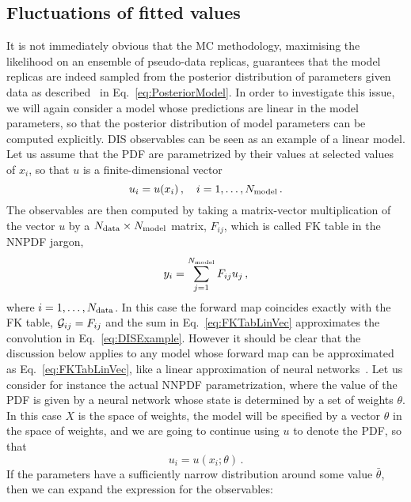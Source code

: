 \subsection{Fluctuations of fitted values}
\label{sec:fluct-fit-values}

It is not immediately obvious that the MC methodology, maximising the likelihood
on an ensemble of pseudo-data replicas, guarantees that the model replicas are
indeed sampled from the posterior distribution of parameters given data as
described \eg\ in Eq.~\ref{eq:PosteriorModel}. In order to investigate this
issue, we will again consider a model whose predictions are linear in the model
parameters, so that the posterior distribution of model parameters can be
computed explicitly. DIS observables can be seen as an example of a linear
model. Let us assume that the PDF are parametrized by their values at selected
values of $x_i$, so that $u$ is a finite-dimensional vector 
\begin{equation}
    \label{eq:Uvector}
    u_i = u(x_i)\, , \quad i = 1, \ldots, N_{\rm model}\, .    
\end{equation}
The observables are then computed by taking a matrix-vector multiplication of
the vector $u$ by a $N_{\rm data} \times N_{\rm model}$ matrix, $F_{ij}$, which is called FK
table in the NNPDF jargon, 
\begin{equation}
    \label{eq:FKTabLinVec}
    y_i = \sum_{j=1}^{N_{\rm model}} F_{ij} u_j\, ,
\end{equation}
where $i=1,\ldots,N_{\rm data}$. In this case the forward map coincides exactly with
the FK table, $\mathcal{G}_{ij} = F_{ij}$ and the sum in Eq.~\ref{eq:FKTabLinVec}
approximates the convolution in Eq.~\ref{eq:DISExample}. However it should be
clear that the discussion below applies to any model whose forward map can be
approximated as Eq.~\ref{eq:FKTabLinVec}, like a linear approximation of
neural networks~\cite{ADVANI2020428}. Let us consider for instance the actual
NNPDF parametrization, where the value of the PDF is given by a neural network
whose state is determined by a set of weights $\theta$. In this case $X$ is the
space of weights, the model will be specified by a vector $\theta$ in the space
of weights, and we are going to continue using $u$ to denote the PDF, so that 
\begin{equation}
    \label{eq:WeightsParam}
    u_i = u(x_i; \theta)\, .
\end{equation}
If the parameters have a sufficiently narrow distribution around some value
$\bar\theta$, then we can expand the expression for the observables:

